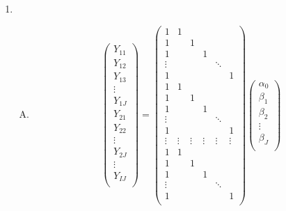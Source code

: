 \documentclass[12pt]{article}
\begin{document}
\begin{enumerate}
    \item
    \begin{enumerate}[A.]
        \item
        $$
        \begin{pmatrix}
            Y_{11}\\
            Y_{12}\\
            Y_{13}\\
            \vdots\\
            Y_{1J}\\
            Y_{21}\\
            Y_{22}\\
            \vdots\\
            Y_{2J}\\
            \vdots\\
            Y_{IJ}\\
        \end{pmatrix} = 
        \begin{pmatrix}
            1 & 1 \\
            1 &  & 1 \\
            1 &  &  & 1 \\
            \vdots &  &  &  & \ddots \\
            1 &  &  &  &  & 1 \\
            1 & 1 \\
            1 &  & 1 \\
            1 &  &  & 1 \\
            \vdots &  &  &  & \ddots \\
            1 &  &  &  &  & 1 \\
            \vdots & \vdots & \vdots & \vdots & \vdots & \vdots \\
            1 & 1 \\
            1 &  & 1 \\
            1 &  &  & 1 \\
            \vdots &  &  &  & \ddots \\
            1 &  &  &  &  & 1 \\
        \end{pmatrix}
        \begin{pmatrix}
            \alpha_0 \\
            \beta_1 \\
            \beta_2 \\
            \vdots \\
            \beta_J\\

\end{pmatrix}$$
\end{enumerate}
\end{enumerate}
\end{document}
